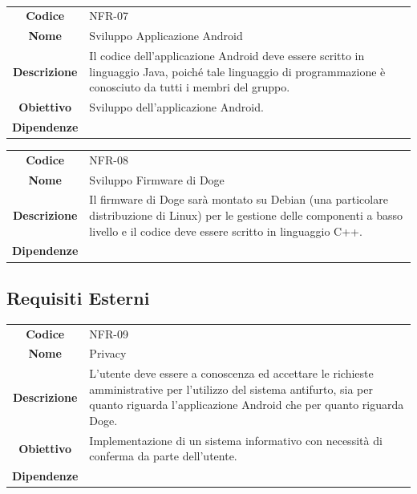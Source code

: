 \documentclass{article}
\begin{document}
~

\begin{adjustbox}{center}
\begin{tabular}{|c|p{10cm}|}
\hline
\textbf{Codice} & NFR-07 \\
\textbf{Nome} & Sviluppo Applicazione Android \\
\textbf{Descrizione} & Il codice dell'applicazione Android deve essere scritto in linguaggio Java, poiché tale linguaggio di programmazione è conosciuto da tutti i membri del gruppo. \\
\textbf{Obiettivo} & Sviluppo dell'applicazione Android. \\
\textbf{Dipendenze} &  \\
\hline
\end{tabular}
\end{adjustbox}

\begin{adjustbox}{center}
\begin{tabular}{|c|p{10cm}|}
\hline
\textbf{Codice} & NFR-08 \\
\textbf{Nome} & Sviluppo Firmware di Doge \\
\textbf{Descrizione} & Il firmware di Doge sarà montato su Debian (una particolare distribuzione di Linux) per le gestione delle componenti a basso livello e il codice deve essere scritto in linguaggio C++. \\
\textbf{Dipendenze} &  \\
\hline
\end{tabular}
\end{adjustbox}

\subsection{Requisiti Esterni}

\begin{adjustbox}{center}
\begin{tabular}{|c|p{10cm}|}
\hline
\textbf{Codice} & NFR-09 \\
\textbf{Nome} & Privacy \\
\textbf{Descrizione} & L'utente deve essere a conoscenza ed accettare le richieste amministrative per l'utilizzo del sistema antifurto, sia per quanto riguarda l'applicazione Android che per quanto riguarda Doge. \\
\textbf{Obiettivo} & Implementazione di un sistema informativo con necessità di conferma da parte dell'utente. \\
\textbf{Dipendenze} &  \\
\hline
\end{tabular}
\end{adjustbox}
\end{document}
